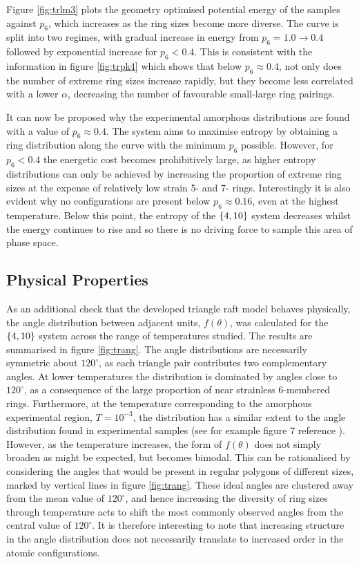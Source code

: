 Figure \ref{fig:trlm3} plots the geometry optimised potential energy of the samples against $p_6$, which increases as the ring sizes become more diverse. 
The curve is split into two regimes, with gradual increase in energy from $p_6=1.0\rightarrow 0.4$ followed by exponential increase for $p_6<0.4$. 
This is consistent with the information in figure \ref{fig:trpk4} which shows that below $p_6\approx 0.4$, not only does the number of extreme ring sizes increase rapidly, but they become less correlated with a lower $\alpha$, decreasing the number of favourable small\--large ring pairings.

It can now be proposed why the experimental amorphous distributions are found with a value of $p_6\approx 0.4$. 
The system aims to maximise entropy by obtaining a ring distribution along the \lm{} curve with the minimum $p_6$ possible. 
However, for $p_6<0.4$ the energetic cost becomes prohibitively large, as higher entropy distributions can only be achieved by increasing the proportion of extreme ring sizes at the expense of relatively low strain 5- and 7- rings.
Interestingly it is also evident why no configurations are present below $p_6\approx 0.16$, even at the highest temperature.
Below this point, the entropy of the $\left\{4,10\right\}$ system decreases whilst the energy continues to rise and so there is no driving force to sample this area of phase space.

\subsection{Physical Properties}
\label{s:trphysprop}

As an additional check that the developed triangle raft model behaves physically, 
the angle distribution between adjacent \sioiii{} units, $f\left(\theta\right)$, was calculated for the $\left\{4,10\right\}$ system across the range of temperatures studied. 
The results are summarised in figure \ref{fig:trang}. 
The angle distributions are necessarily symmetric about $120^\circ$, as each triangle pair contributes two complementary angles. 
At lower temperatures the distribution is dominated by angles close to $120^\circ$, as a consequence of the large proportion of near strainless 6\--membered rings.
Furthermore, at the temperature corresponding to the amorphous experimental region, $T=10^{-3}$, the distribution has a similar extent to the angle distribution found in experimental samples (see for example figure 7 reference \cite{Roy2018}). 
However, as the temperature increases, the form of $f\left(\theta\right)$ does not simply broaden as might be expected, but becomes bimodal. 
This can be rationalised by considering the angles that would be present in regular polygons of different sizes, marked by vertical lines in figure \ref{fig:trang}.  These ideal angles are clustered away from the mean value of $120^\circ$, and hence increasing the diversity of ring sizes through temperature acts to shift the most commonly observed angles from the central value of $120^\circ$. 
It is therefore interesting to note that increasing structure in the angle distribution does not necessarily translate to increased order in the atomic configurations.

